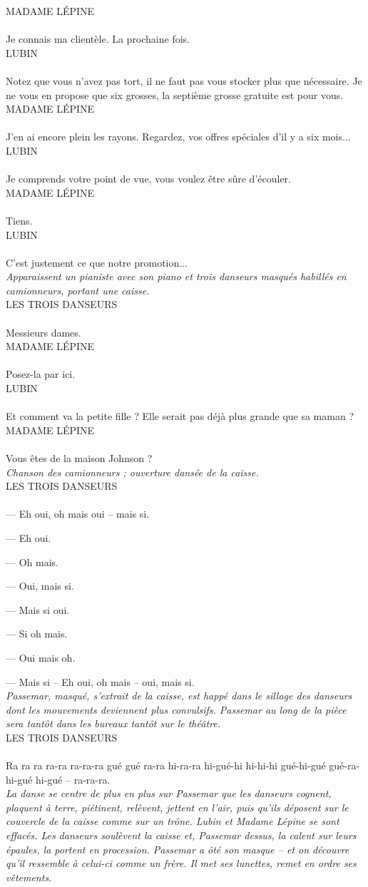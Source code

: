 \documentclass[a4paper]{report}
\newcounter{rem}[chapter]
\newcommand{\repl}[2]{\uppercase{#1}\\\\#2\\}
\newcommand{\didas}[1]{\textit{#1}\\}
\begin{document}
\repl{Madame Lépine}{Je connais ma clientèle. La prochaine fois.}

\repl{Lubin}{Notez que vous n'avez pas tort, il ne faut pas vous stocker plus que nécessaire. Je ne vous en propose que six grosses, la septième grosse gratuite est pour vous.}

\repl{Madame Lépine}{J'en ai encore plein les rayons. Regardez, vos offres spéciales d'il y a six mois...}

\repl{Lubin}{Je comprends votre point de vue, vous voulez être sûre d'écouler.}

\repl{Madame Lépine}{Tiens.}

\repl{Lubin}{C'est justement ce que notre promotion...}

\didas{Apparaissent un pianiste avec son piano et trois danseurs masqués habillés en camionneurs, portant une caisse.}

\repl{Les trois danseurs}{Messieurs dames.}

\repl{Madame Lépine}{Posez-la par ici.}

\repl{Lubin}{Et comment va la petite fille ? Elle serait pas déjà plus grande que sa maman ?}

\repl{Madame Lépine}{Vous êtes de la maison Johnson ?}

\didas{Chanson des camionneurs ; ouverture dansée de la caisse.}

\repl{Les trois danseurs}{--- Eh oui, oh mais oui -- mais si.

--- Eh oui.

--- Oh mais.

--- Oui, mais si.

--- Mais si oui.

--- Si oh mais.

--- Oui mais oh.

--- Mais si -- Eh oui, oh mais -- oui, mais si.}

\didas{Passemar, masqué, s'extrait de la caisse, est happé dans le sillage des danseurs dont les mouvements deviennent plus convulsifs. Passemar au long de la pièce sera tantôt dans les bureaux tantôt sur le théâtre.}

\repl{Les trois danseurs}{Ra ra ra ra-ra ra-ra-ra gué gué ra-ra hi-ra-ra hi-gué-hi hi-hi-hi gué-hi-gué gué-ra-hi-gué hi-gué -- ra-ra-ra.}

\didas{La danse se centre de plus en plus sur Passemar que les danseurs cognent, plaquent à terre, piétinent, relèvent, jettent en l'air, puis qu'ils déposent sur le couvercle de la caisse comme sur un trône. Lubin et Madame Lépine se sont effacés. Les danseurs soulèvent la caisse et, Passemar dessus, la calent sur leurs épaules, la portent en procession. Passemar a ôté son masque -- et on découvre qu'il ressemble à celui-ci comme un frère. Il met ses lunettes, remet en ordre ses vêtements.}
\end{document}
